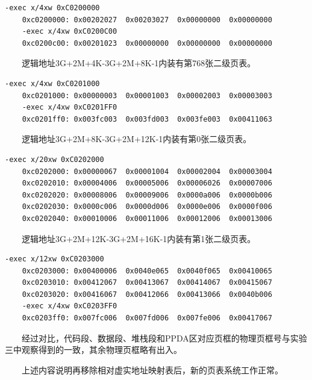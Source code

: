 \begin{Verbatim}[frame=single,fontsize=\small]
    -exec x/4xw 0xC0200000
    0xc0200000:	0x00202027	0x00203027	0x00000000	0x00000000
    -exec x/4xw 0xC0200C00
    0xc0200c00:	0x00201023	0x00000000	0x00000000	0x00000000
\end{Verbatim}
\label{relative_directory}

　　逻辑地址3G+2M+4K-3G+2M+8K-1内装有第768张二级页表。

\begin{Verbatim}[frame=single,fontsize=\small]
    -exec x/4xw 0xC0201000
    0xc0201000:	0x00000003	0x00001003	0x00002003	0x00003003
    -exec x/4xw 0xC0201FF0
    0xc0201ff0:	0x003fc003	0x003fd003	0x003fe003	0x00411063
\end{Verbatim}
\label{mem768}

　　逻辑地址3G+2M+8K-3G+2M+12K-1内装有第0张二级页表。

\begin{Verbatim}[frame=single,fontsize=\small]
    -exec x/20xw 0xC0202000
    0xc0202000:	0x00000067	0x00001004	0x00002004	0x00003004
    0xc0202010:	0x00004006	0x00005006	0x00006026	0x00007006
    0xc0202020:	0x00008006	0x00009006	0x0000a006	0x0000b006
    0xc0202030:	0x0000c006	0x0000d006	0x0000e006	0x0000f006
    0xc0202040:	0x00010006	0x00011006	0x00012006	0x00013006
\end{Verbatim}
\label{mem0}

　　逻辑地址3G+2M+12K-3G+2M+16K-1内装有第1张二级页表。

\begin{Verbatim}[frame=single,fontsize=\small]
    -exec x/12xw 0xC0203000
    0xc0203000:	0x00400006	0x0040e065	0x0040f065	0x00410065
    0xc0203010:	0x00412067	0x00413067	0x00414067	0x00415067
    0xc0203020:	0x00416067	0x00412066	0x00413066	0x0040b006
    -exec x/4xw 0xC0203FF0
    0xc0203ff0:	0x007fc006	0x007fd006	0x007fe006	0x00417067
\end{Verbatim}
\label{mem1}

　　经过对比，代码段、数据段、堆栈段和PPDA区对应页框的物理页框号与实验三中观察得到的一致，其余物理页框略有出入。

　　上述内容说明再移除相对虚实地址映射表后，新的页表系统工作正常。
\clearpage